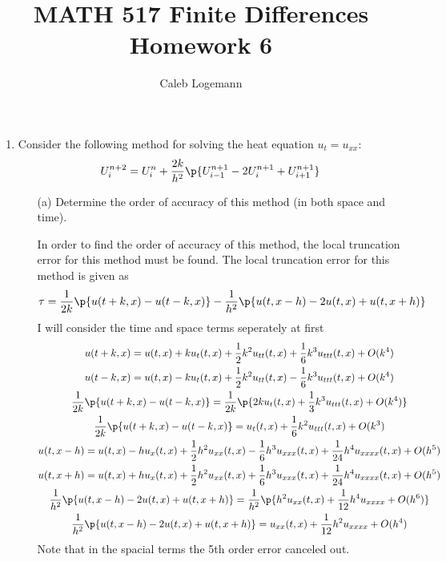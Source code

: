 \documentclass[11pt, oneside, titlepage]{article}
\title{MATH 517 Finite Differences Homework 6}
\author{Caleb Logemann}
\begin{document}
\maketitle

%
\begin{enumerate}
    \item %
        Consider the following method for solving the heat equation $u_t = u_{xx}$:
        \[
            U^{n+2}_i = U^n_i + \frac{2k}{h^2}\p{U^{n+1}_{i-1} - 2U^{n+1}_i + U^{n+1}_{i+1}}
        \]
        \begin{enumerate}
            \item[(a)] %
                Determine the order of accuracy of this method (in both space
                and time).

                In order to find the order of accuracy of this method, the
                local truncation error for this method must be found.
                The local truncation error for this method is given as
                \begin{align*}
                    \tau &= \frac{1}{2k}\p{u(t + k, x) - u(t - k, x)} - \frac{1}{h^2}
                        \p{u(t, x-h) - 2u(t, x) + u(t, x+h)}
                \end{align*}
                I will consider the time and space terms seperately at first
                \begin{gather*}
                    u(t + k, x) = u(t, x) + k u_t(t, x) + \frac{1}{2} k^2 u_{tt}(t, x) + \frac{1}{6}k^3 u_{ttt}(t, x) + O(k^4) \\
                    u(t - k, x) = u(t, x) - k u_t(t, x) + \frac{1}{2} k^2 u_{tt}(t, x) - \frac{1}{6}k^3 u_{ttt}(t, x) + O(k^4) \\
                    \frac{1}{2k}\p{u(t + k, x) - u(t - k, x)} = \frac{1}{2k}\p{2k u_t(t, x) + \frac{1}{3}k^3 u_{ttt}(t, x) + O(k^4)} \\
                    \frac{1}{2k}\p{u(t + k, x) - u(t - k, x)} = u_t(t, x) + \frac{1}{6}k^2 u_{ttt}(t, x) + O(k^3) \\
                    u(t, x-h) = u(t, x) - h u_x(t, x) + \frac{1}{2} h^2 u_{xx}(t, x) - \frac{1}{6} h^3 u_{xxx}(t, x) + \frac{1}{24} h^4 u_{xxxx}(t, x) + O(h^5) \\
                    u(t, x+h) = u(t, x) + h u_x(t, x) + \frac{1}{2} h^2 u_{xx}(t, x) + \frac{1}{6} h^3 u_{xxx}(t, x) + \frac{1}{24} h^4 u_{xxxx}(t, x) + O(h^5) \\
                    \frac{1}{h^2}\p{u(t, x-h) - 2u(t, x) + u(t, x+h)} = \frac{1}{h^2} \p{h^2 u_{xx}(t, x) + \frac{1}{12} h^4 u_{xxxx} + O(h^6)} \\
                    \frac{1}{h^2}\p{u(t, x-h) - 2u(t, x) + u(t, x+h)} = u_{xx}(t, x) + \frac{1}{12} h^2 u_{xxxx} + O(h^4)
                \end{gather*}
                Note that in the spacial terms the 5th order error canceled out.


\end{enumerate}
\end{enumerate}
\end{document}
